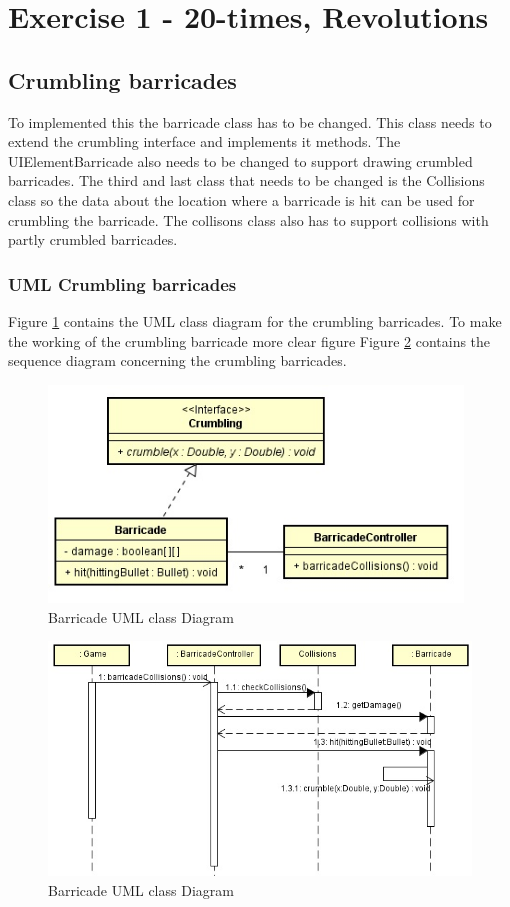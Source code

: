 \section{Exercise 1 - 20-times, Revolutions }
\subsection{Crumbling barricades }
To implemented this the barricade class has to be changed. This class needs to extend the crumbling interface and implements it methods. The UIElementBarricade also needs to be changed to support drawing crumbled barricades. The third and last class that needs to be changed is the Collisions class so the data about the location where a barricade is hit can be used for crumbling the barricade. The collisons class also has to support collisions with partly crumbled barricades.
\newpage
\subsubsection{UML Crumbling barricades}
Figure \ref{fig:1-1barricadeClass} contains the UML class diagram for the crumbling barricades.
To make the working of the crumbling barricade more clear figure Figure \ref{fig:1-1barricadeSequence} contains the sequence diagram concerning the crumbling barricades.
\begin{figure}[ht!]
\centering
\includegraphics[width=11cm]{BarricadeClass.jpg}
\caption{Barricade UML class Diagram}
\label{fig:1-1barricadeClass}
\end{figure}
\begin{figure}[ht!]
\centering
\includegraphics[width=16cm]{BarricadeSequence.jpg}
\caption{Barricade UML class Diagram}
\label{fig:1-1barricadeSequence}
\end{figure}
\newpage
